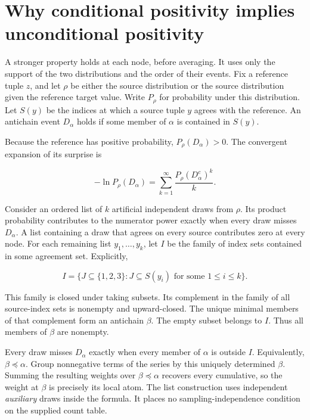 \clearpage

\section{Why conditional positivity implies unconditional positivity}\label{why-conditional-positivity-implies-unconditional-positivity}

A stronger property holds at each node, before averaging. It uses only the support of the two distributions and the order of their events. Fix a reference tuple \(z\), and let \(\rho\) be either the source distribution or the source distribution given the reference target value. Write \(P_\rho\) for probability under this distribution. Let \(S(y)\) be the indices at which a source tuple \(y\) agrees with the reference. An antichain event \(D_\alpha\) holds if some member of \(\alpha\) is contained in \(S(y)\).

Because the reference has positive probability, \(P_\rho(D_\alpha)>0\). The convergent expansion of its surprise is

\[
-\ln P_\rho(D_\alpha)=\sum_{k=1}^{\infty}\frac{P_\rho(D_\alpha^c)^k}{k}.
\]

Consider an ordered list of \(k\) artificial independent draws from \(\rho\). Its product probability contributes to the numerator power exactly when every draw misses \(D_\alpha\). A list containing a draw that agrees on every source contributes zero at every node. For each remaining list \(y_1,\ldots,y_k\), let \(I\) be the family of index sets contained in some agreement set. Explicitly,

\[
I=\{J\subseteq\{1,2,3\}: J\subseteq S(y_i)\text{ for some }1\leq i\leq k\}.
\]

This family is closed under taking subsets. Its complement in the family of all source-index sets is nonempty and upward-closed. The unique minimal members of that complement form an antichain \(\beta\). The empty subset belongs to \(I\). Thus all members of \(\beta\) are nonempty.

Every draw misses \(D_\alpha\) exactly when every member of \(\alpha\) is outside \(I\). Equivalently, \(\beta\preceq\alpha\). Group nonnegative terms of the series by this uniquely determined \(\beta\). Summing the resulting weights over \(\beta\preceq\alpha\) recovers every cumulative, so the weight at \(\beta\) is precisely its local atom. The list construction uses independent \emph{auxiliary} draws inside the formula. It places no sampling-independence condition on the supplied count table.

